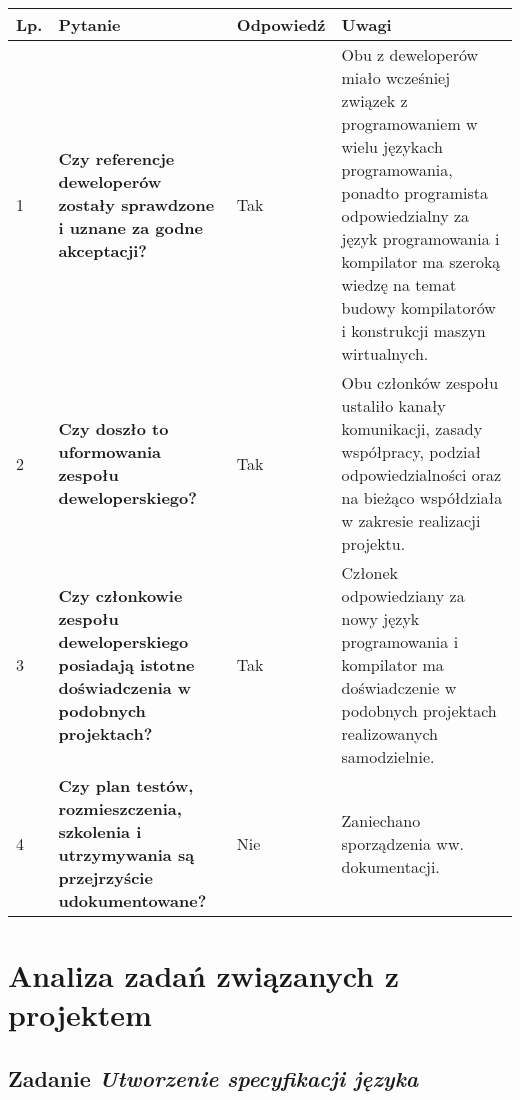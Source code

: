 \documentclass[11pt,oneside,a4paper,titlepage,onecolumn]{article}
\begin{document}
\begin{tabularx}{\textwidth}{|l|X|l|X|}
    \hline
    Lp. & Pytanie & Odpowiedź & Uwagi \\ \hline
    
    1
    & \textbf{Czy referencje deweloperów zostały sprawdzone i uznane za godne akceptacji?} 
    & Tak
    & Obu z deweloperów miało wcześniej związek z programowaniem w wielu językach programowania, ponadto programista 
    odpowiedzialny za język programowania i kompilator ma szeroką wiedzę na temat budowy kompilatorów i konstrukcji
    maszyn wirtualnych.
    \\\hline

	2
	& \textbf{Czy doszło to uformowania zespołu deweloperskiego?}
	& Tak
	& Obu członków zespołu ustaliło kanały komunikacji, zasady współpracy, podział odpowiedzialności oraz na bieżąco 
	współdziała w zakresie realizacji projektu.
	\\\hline

	3
	& \textbf{Czy członkowie zespołu deweloperskiego posiadają istotne doświadczenia w podobnych projektach?}
	& Tak
	& Członek odpowiedziany za nowy język programowania i kompilator ma doświadczenie w podobnych projektach 
	realizowanych samodzielnie.
	\\\hline
	
	4
	& \textbf{Czy plan testów, rozmieszczenia, szkolenia i utrzymywania są przejrzyście udokumentowane?} 
	& Nie
	& Zaniechano sporządzenia ww. dokumentacji.
    
    \\\hline
\end{tabularx}

\newpage

\section{Analiza zadań związanych z projektem}

\subsection{Zadanie \textit{Utworzenie specyfikacji języka}}

\phantom{...}
\end{document}
